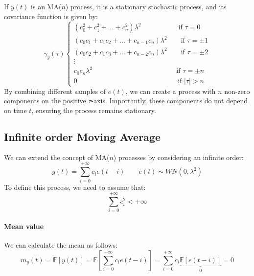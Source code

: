 If $y(t)$ is an MA($n$) process, it is a stationary stochastic process, and its covariance function is given by:
\[\gamma_y(\tau)\begin{cases}
    \left(c_0^2+c_1^2+\dots+c_n^2\right)\lambda^2 \qquad\qquad\quad\:\: \text{if }\tau = 0 \\
    \left(c_0c_1+c_1c_2+\dots+c_{n-1}c_n\right)\lambda^2 \qquad \text{if }\tau = \pm 1 \\
    \left(c_0c_2+c_1c_3+\dots+c_{n-2}c_n\right)\lambda^2 \qquad \text{if }\tau = \pm 2\\
    \vdots \\
    c_0c_n\lambda^2 \qquad\qquad\qquad\qquad\qquad\qquad\: \text{if }\tau = \pm n\\
    0 \qquad\qquad\qquad\qquad\qquad\qquad\qquad\:\:\: \text{if }\left\lvert \tau\right\rvert >n
\end{cases}\]
By combining different samples of $e(t)$, we can create a process with $n$ non-zero components on the positive $\tau$-axis. 
Importantly, these components do not depend on time $t$, ensuring the process remains stationary.

\subsection{Infinite order Moving Average}
We can extend the concept of MA($n$) processes by considering an infinite order:
\[y(t)=\sum_{i=0}^{+\infty}c_i e(t-i)\qquad e(t)\sim WN(0,\lambda^2)\]
To define this process, we need to assume that:
\[\sum_{i=0}^{+\infty}c_i^2<+\infty\]

\paragraph*{Mean value}
We can calculate the mean as follows:
\[m_y(t)=\mathbb{E}\left[y(t)\right]=\mathbb{E}\left[\sum_{i=0}^{+\infty}c_i e(t-i)\right]=\sum_{i=0}^{+\infty}c_i\underbrace{\mathbb{E}\left[e(t-i)\right]}_0=0\]

